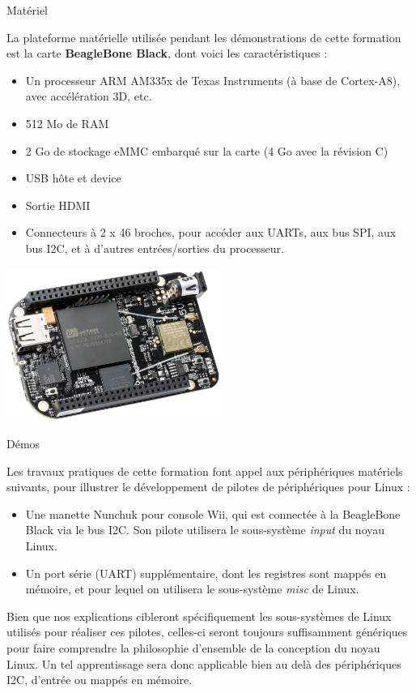 \documentclass[a4paper,12pt,obeyspaces,spaces,hyphens]{article}
\begin{document}
\feagendatwocolumn
{Matériel}
{
  La plateforme matérielle utilisée pendant les démonstrations de
  cette formation est la carte {\bf BeagleBone Black}, dont voici les
  caractéristiques :

  \begin{itemize}
  \item Un processeur ARM AM335x de Texas Instruments (à base de
    Cortex-A8), avec accélération 3D, etc.
  \item 512 Mo de RAM
  \item 2 Go de stockage eMMC embarqué sur la carte
	\newline(4 Go avec la révision C)
  \item USB hôte et device
  \item Sortie HDMI
  \item Connecteurs à 2 x 46 broches, pour accéder aux UARTs, aux
        bus SPI, aux bus I2C, et à d'autres entrées/sorties du
        processeur.
  \end{itemize}
}
{}
{
  \begin{center}
    \includegraphics[height=5cm]{../slides/beagleboneblack-board/beagleboneblack.png}
  \end{center}
}

\feagendaonecolumn
{Démos}
{
  Les travaux pratiques de cette formation font appel aux périphériques
  matériels suivants, pour illustrer le développement de pilotes de
  périphériques pour Linux :

  \begin{itemize}
  \item Une manette Nunchuk pour console Wii, qui est connectée à la
    BeagleBone Black via le bus I2C. Son pilote utilisera le
    sous-système {\em input} du noyau Linux.
  \item Un port série (UART) supplémentaire, dont les registres sont
    mappés en mémoire, et pour lequel on utilisera le sous-système {\em
    misc} de Linux.
  \end{itemize}

  Bien que nos explications cibleront spécifiquement les sous-systèmes
  de Linux utilisés pour réaliser ces pilotes, celles-ci seront toujours
  suffisamment génériques pour faire comprendre la philosophie
  d'ensemble de la conception du noyau Linux. Un tel apprentissage
  sera donc applicable bien au delà des périphériques I2C, d'entrée ou
  mappés en mémoire.
}
\end{document}

